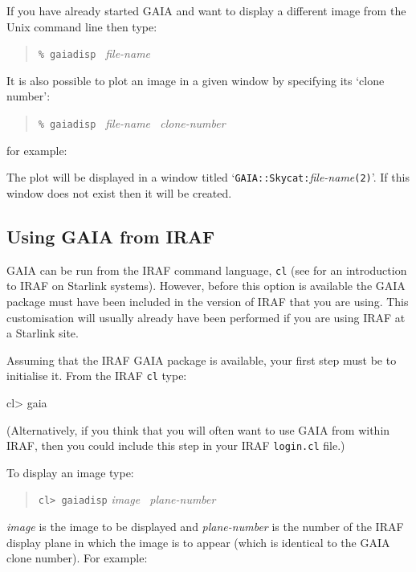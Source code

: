 \documentclass[twoside,11pt]{starlink}
\begin{document}
If you have already started GAIA and want to display a different image
from the Unix command line then type:

\begin{quote}
\texttt{\%  gaiadisp} \textit{~file-name}
\end{quote}

It is also possible to plot an image in a given window by specifying its
`clone number':

\begin{quote}
\texttt{\%  gaiadisp} \textit{~file-name ~clone-number}
\end{quote}

for example:

\begin{terminalv}
\end{terminalv}

The plot will be displayed in a window titled `\texttt{GAIA::Skycat:}\textit{file-name}\/\texttt{(2)}'.  If this window does not exist
then it will be created.

\subsection{Using GAIA from IRAF}

GAIA can be run from the IRAF command language, \texttt{cl} (see
\cite{SG12} for an introduction to IRAF on Starlink
systems).  However, before this option is available the GAIA package must
have been included in the version of IRAF that you are using.  This
customisation will usually already have been performed if you are using
IRAF at a Starlink site.

Assuming that the IRAF GAIA package is available, your first step must
be to initialise it.  From the IRAF \texttt{cl} type:

\begin{terminalv}
cl>  gaia
\end{terminalv}

(Alternatively, if you think that you will often want to use GAIA from
within IRAF, then you could include this step in your IRAF \texttt{login.cl}
file.)

To display an image type:

\begin{quote}
\texttt{cl>  gaiadisp} \textit{image ~plane-number}
\end{quote}

\textit{image}\/ is the image to be displayed and \textit{plane-number}\/ is
the number of the IRAF display plane in which the image is to appear
(which is identical to the GAIA clone number).  For example:
\end{document}
